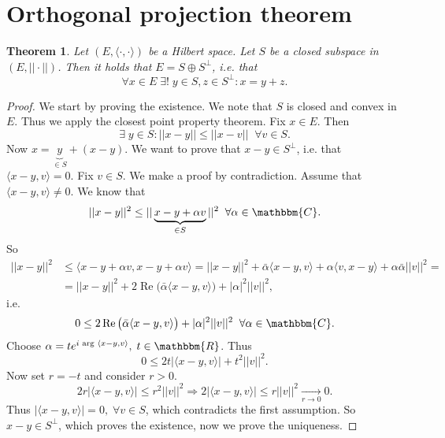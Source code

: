 \documentclass[12pt, a4paper]{article}
\newcommand{\R}{\ensuremath{\mathbbm{R}}}
\newcommand{\C}{\ensuremath{\mathbbm{C}}}
\newtheorem{theorem}{Theorem}[section]
\begin{document}
\section{Orthogonal projection theorem}
\begin{theorem}
Let $(E,\langle\cdot,\cdot\rangle)$ be a Hilbert space. Let $S$ be a closed subspace in $(E,||\cdot||)$. Then it holds that $E=S\oplus S^{\perp}$, i.e. that
\begin{equation*}
\forall x \in E \; \exists ! \; y\in S, z\in S^{\perp} : x=y+z.
\end{equation*}
\end{theorem}

\begin{proof}
We start by proving the existence. We note that $S$ is closed and convex in $E$. Thus we apply the closest point property theorem. Fix $x\in E$. Then
\begin{equation*}
\exists \;y \in S : ||x-y||\leq ||x-v||\;\; \forall v \in S.
\end{equation*}
Now $x = \underbrace{y}_{\in S} + (x-y)$. We want to prove that $x-y \in S^{\perp}$, i.e. that $\langle x-y, v \rangle = 0$. Fix $v\in S$. We make a proof by contradiction. Assume that $\langle x-y, v\rangle\neq 0$. We know that
\begin{equation*}
||x-y||^2 \leq ||\underbrace{x-y+\alpha v}_{\in S}||^ 2 \;\; \forall \alpha \in \C.
\end{equation*}
So
\begin{equation*}
\begin{split}
||x-y||^2 &\leq \langle x-y+ \alpha v, x-y + \alpha v\rangle = ||x-y||^2 + \bar{\alpha}\langle x-y, v\rangle + \alpha \langle v, x-y \rangle + \alpha \bar{\alpha} ||v||^ 2 = \\
&= ||x-y||^2 + 2\operatorname{Re}\big(\bar{\alpha}\langle x-y, v\rangle\big) + |\alpha|^2 ||v||^2,
\end{split}
\end{equation*}
i.e.
\begin{equation*}
0\leq 2\operatorname{Re}\big(\bar{\alpha}\langle x-y, v\rangle\big) + |\alpha|^2 ||v||^2 \;\; \forall \alpha \in \C.
\end{equation*}
Choose $\alpha = te^{i \text{ arg } \langle x-y,v\rangle}, \; t\in\R$. Thus
\begin{equation*}
0\leq 2t \big|\langle x-y, v \rangle\big| + t^2 ||v||^2.
\end{equation*}
Now set $r=-t$ and consider $r>0$.
\begin{equation*}
2r \big| \langle x-y, v \rangle \big | \leq r^2 ||v||^2 \Rightarrow 2\big| \langle x-y,v\rangle \big| \leq r ||v||^2 \underset{r \to 0}{\to} 0.
\end{equation*}
Thus $\big| \langle x-y, v \rangle \big| = 0, \; \forall v\in S$, which contradicts the first assumption. So $x-y \in S^{\perp}$, which proves the existence, now we prove the uniqueness.

\end{proof}
\end{document}
